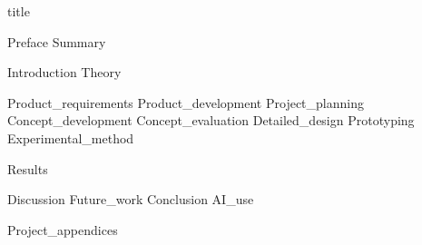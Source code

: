 \documentclass{article}
\begin{document}
\hypersetup{pageanchor=false}
{title}

\frontmatter
\hypersetup{pageanchor=true}

{Preface}
\newpage
{Summary}
\newpage

\tableofcontents

\listoffigures
\listoftables

\mainmatter

{Introduction}
{Theory}

{Product_requirements}
{Product_development}
{Project_planning}
{Concept_development}
{Concept_evaluation}
{Detailed_design}
{Prototyping}
{Experimental_method}

{Results}

{Discussion}
{Future_work}
{Conclusion}
{AI_use}

\newpage
\printbibliography[heading = bibintoc, title = Referanser]    %

\addappendix
{Project_appendices}

\end{document}
